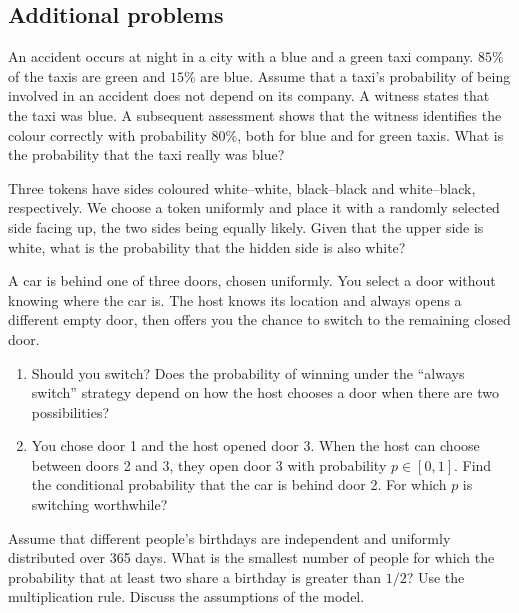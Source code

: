 \documentclass[11pt,a4paper]{article}
\newenvironment{enumeratea}{\begin{enumerate}[label=(\alph*),itemsep=0.28em,topsep=0.25em]}{\end{enumerate}}
\newcounter{problem}[section]
\begin{document}
\subsection*{Additional problems}
\begin{probleminteresting}
An accident occurs at night in a city with a blue and a green taxi company.
$85\%$ of the taxis are green and $15\%$ are blue. Assume that a taxi's probability
of being involved in an accident does not depend on its company.
A witness states that the taxi was blue. A subsequent assessment shows that the
witness identifies the colour correctly with probability $80\%$, both for blue
and for green taxis. What is the probability that the taxi really was blue?
\end{probleminteresting}
\begin{problem}
Three tokens have sides coloured white--white, black--black and white--black,
respectively. We choose a token uniformly and place it with a randomly selected
side facing up, the two sides being equally likely. Given that the upper side is
white, what is the probability that the hidden side is also white?
\end{problem}
\begin{probleminteresting}
A car is behind one of three doors, chosen uniformly. You select a door without
knowing where the car is. The host knows its location and always opens a different
empty door, then offers you the chance to switch to the remaining closed door.
\begin{enumeratea}
  \item Should you switch? Does the probability of winning under the ``always switch''
  strategy depend on how the host chooses a door when there are two possibilities?
  \item You chose door 1 and the host opened door 3. When the host can choose between
  doors 2 and 3, they open door 3 with probability $p\in[0,1]$.
  Find the conditional probability that the car is behind door 2. For which $p$ is switching worthwhile?
\end{enumeratea}
\end{probleminteresting}
\begin{probleminteresting}
Assume that different people's birthdays are independent and uniformly distributed
over 365 days. What is the smallest number of people for which the probability
that at least two share a birthday is greater than $1/2$? Use the multiplication
rule. Discuss the assumptions of the model.
\end{probleminteresting}
\end{document}

